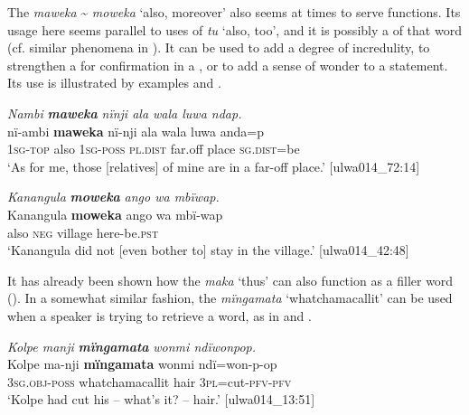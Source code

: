 The  \textit{maweka} {\textasciitilde} \textit{moweka} ‘also, moreover’ also seems at times to serve  functions. Its usage here seems parallel to  uses of  \textit{tu} ‘also, too’, and it is possibly a  of that word (cf. similar phenomena in ). It can be used to add a degree of incredulity, to strengthen a  for confirmation in a , or to add a sense of wonder to a statement. Its use is illustrated by examples  and .

\ea%
    \label{ex:otherwc:140}
          \textit{Nambi} \textbf{\textit{maweka}} \textit{nïnji ala wala luwa ndap.}\\
      \gll nï-ambi  \textbf{maweka}  nï-nji    ala      wala  luwa anda=p\\
    1\textsc{sg-top}  also    1\textsc{sg-poss}  \textsc{pl.dist}  far.off  place    \textsc{sg.dist}=be\\
\glt `As for me, those [relatives] of mine are in a far-off place.’ [ulwa014\_72:14]
\z

\ea%
    \label{ex:otherwc:141}
          \textit{Kanangula} \textbf{\textit{moweka}} \textit{ango wa mbïwap.}\\
\gll    Kanangula  \textbf{moweka}  ango  wa    mbï-wap\\
    [name]    also    \textsc{neg}  village  here-be\textsc{.pst}\\
\glt `Kanangula did not [even bother to] stay in the village.’ [ulwa014\_42:48]
\z

It has already been shown how the  \textit{maka} ‘thus’ can also function as a filler word (). In a somewhat similar fashion, the  \linebreak \textit{mïngamata} ‘whatchamacallit’ can be used when a speaker is trying to retrieve a word, as in  and .


\ea%
    \label{ex:otherwc:142}
          \textit{Kolpe manji} \textbf{\textit{mïngamata}} \textit{wonmi ndïwonpop.}\\
\gll    Kolpe  ma-nji      \textbf{mïngamata}    wonmi  ndï=won-p-op\\
    [name]  3\textsc{sg.obj-poss}  whatchamacallit  hair  3\textsc{pl}=cut-\textsc{pfv-pfv}\\
\glt `Kolpe had cut his -- what’s it? -- hair.’ [ulwa014\_13:51]
\z

